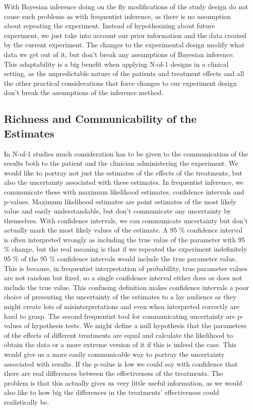 \documentclass[12pt,a4paper,leqno]{report}
\theoremstyle{plain}
\theoremstyle{definition}
\theoremstyle{remark}
\begin{document}
With Bayesian inference doing on the fly modifications of the study design do not
cause such problems as with frequentist inference, as there is no assumption
about repeating the experiment. Instead of hypothesizing about future
experiment, we just take into account our prior information and the data created by
the current experiment. The changes to the experimental design modify what data
we get out of it, but don't break any assumptions of Bayesian inference. This
adaptability is a big benefit when applying N-of-1 designs in a clinical setting, as
the unpredictable nature of the patients and treatment effects and all the other
practical considerations that force changes to our experiment design don't
break the assumptions of the inference method.

\subsection{Richness and Communicability of the Estimates}\label{whybayes}

In N-of-1 studies much consideration has to be given to the communication of the
results both to the patient and the clinician administering the experiment. We
would like to portray not just the estimates of the effects of the treatments,
but also the uncertainty associated with these estimates. In frequentist
inference, we communicate these with maximum likelihood estimates, confidence
intervals and p-values. Maximum likelihood estimates are point estimates of the most
likely value and easily understandable, but don't communicate any uncertainty by themselves. With confidence
intervals, we can communicate uncertainty but don't actually mark the most likely
values of the estimate. A 95 \% confidence interval is often interpreted wrongly
as including the true value of the parameter with 95 \% change, but the real
meaning is that if we repeated the experiment indefinitely 95 \% of the
95 \% confidence intervals would include the true parameter value. This is
because, in frequentist interpretation of probability, true parameter values
are not random but fixed, so a single confidence interval either does or does
not include the true value. This confusing definition makes confidence intervals
a poor choice of presenting the uncertainty of the estimates to a lay audience
as they might create lots of misinterpretations and even when interpreted correctly
are hard to grasp. The second frequentist tool for communicating uncertainty
are p-values of hypothesis tests. We might define a null hypothesis that the
parameters of the effects of different treatments are equal and calculate the
likelihood to obtain the data or a more extreme version of it if this is indeed the
case. This would give us a more easily communicable way to portray the uncertainty
associated with results. If the p-value is low we could say with confidence that there are
real differences between the effectiveness of the treatments. The problem is that this actually gives us very little useful
information, as we would also like to how big the differences in the treatments' effectiveness
could realistically be.
\end{document}
